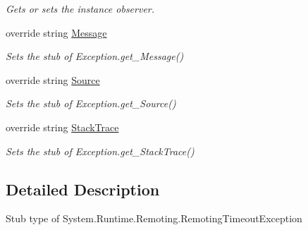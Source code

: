 \begin{DoxyCompactItemize}
\begin{DoxyCompactList}\small\item\em Gets or sets the instance observer.\end{DoxyCompactList}\item 
override string \hyperlink{class_system_1_1_runtime_1_1_remoting_1_1_fakes_1_1_stub_remoting_timeout_exception_a4d840019719039207203c71b50cf992a}{Message}
\begin{DoxyCompactList}\small\item\em Sets the stub of Exception.\-get\-\_\-\-Message()\end{DoxyCompactList}\item 
override string \hyperlink{class_system_1_1_runtime_1_1_remoting_1_1_fakes_1_1_stub_remoting_timeout_exception_a5cd257e96f4f893410f67e610e43f48d}{Source}
\begin{DoxyCompactList}\small\item\em Sets the stub of Exception.\-get\-\_\-\-Source()\end{DoxyCompactList}\item 
override string \hyperlink{class_system_1_1_runtime_1_1_remoting_1_1_fakes_1_1_stub_remoting_timeout_exception_ab3557aaa0ae39fa490d44c42e0d83a88}{Stack\-Trace}
\begin{DoxyCompactList}\small\item\em Sets the stub of Exception.\-get\-\_\-\-Stack\-Trace()\end{DoxyCompactList}\end{DoxyCompactItemize}


\subsection{Detailed Description}
Stub type of System.\-Runtime.\-Remoting.\-Remoting\-Timeout\-Exception



